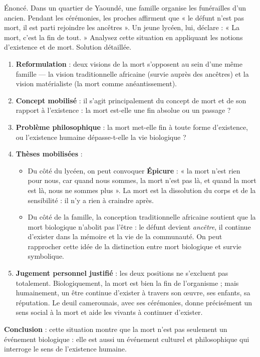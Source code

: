 \documentclass[11pt]{article}
\newcommand{\cle}[1]{{\popxbold\color{popdark}#1}}
\begin{document}
\begin{exoresolu}
Énoncé. Dans un quartier de Yaoundé, une famille organise les funérailles d'un ancien. Pendant les cérémonies, les proches affirment que « le défunt n'est pas mort, il est parti rejoindre les ancêtres ». Un jeune lycéen, lui, déclare : « La mort, c'est la fin de tout. » Analysez cette situation en appliquant les notions d'existence et de mort.
\tcblower
Solution détaillée.
\begin{enumerate}
\item \textbf{Reformulation} : deux visions de la mort s'opposent au sein d'une même famille — la vision traditionnelle africaine (survie auprès des ancêtres) et la vision matérialiste (la mort comme anéantissement).
\item \textbf{Concept mobilisé} : il s'agit principalement du concept de \cle{mort} et de son rapport à l'\cle{existence} : la mort est-elle une fin absolue ou un passage ?
\item \textbf{Problème philosophique} : la mort met-elle fin à toute forme d'existence, ou l'existence humaine dépasse-t-elle la vie biologique ?
\item \textbf{Thèses mobilisées} :
\begin{itemize}
\item Du côté du lycéen, on peut convoquer \textbf{Épicure} : « la mort n'est rien pour nous, car quand nous sommes, la mort n'est pas là, et quand la mort est là, nous ne sommes plus ». La mort est la dissolution du corps et de la sensibilité : il n'y a rien à craindre après.
\item Du côté de la famille, la conception traditionnelle africaine soutient que la mort biologique n'abolit pas l'être : le défunt devient \emph{ancêtre}, il continue d'exister dans la mémoire et la vie de la communauté. On peut rapprocher cette idée de la distinction entre mort biologique et survie symbolique.
\end{itemize}
\item \textbf{Jugement personnel justifié} : les deux positions ne s'excluent pas totalement. Biologiquement, la mort est bien la fin de l'organisme ; mais humainement, un être continue d'exister à travers son œuvre, ses enfants, sa réputation. Le deuil camerounais, avec ses cérémonies, donne précisément un sens social à la mort et aide les vivants à continuer d'exister.
\end{enumerate}
\textbf{Conclusion} : cette situation montre que la mort n'est pas seulement un événement biologique : elle est aussi un événement culturel et philosophique qui interroge le sens de l'existence humaine.
\end{exoresolu}
\end{document}
